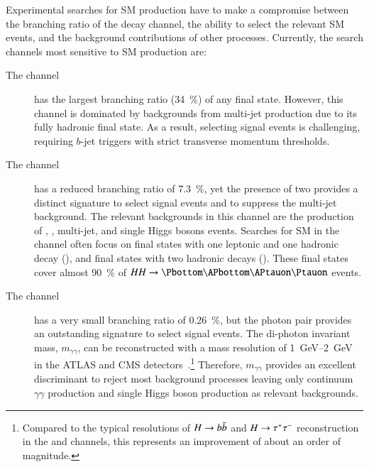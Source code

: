 Experimental searches for SM \HH production have to make a compromise between
the branching ratio of the decay channel, the ability to select the relevant SM
\HH events, and the background contributions of other processes. Currently, the
search channels most sensitive to SM \HH production are:
\begin{description}

\item[The \bbbb channel] has the largest branching ratio (\SI{34}{\percent}) of
  any final state. However, this channel is dominated by backgrounds from
  multi-jet production due to its fully hadronic final state. As a result,
  selecting signal events is challenging, requiring $b$-jet triggers with strict
  transverse momentum thresholds.

\item[The \bbtautau channel] has a reduced branching ratio of
  \SI{7.3}{\percent}, yet the presence of two \tauleptons provides a distinct
  signature to select signal events and to suppress the multi-jet
  background. The relevant backgrounds in this channel are the production of
  \ttbar, \Zjets, multi-jet, and single Higgs bosons events. Searches for SM \HH
  in the \bbtautau channel often focus on final states with one leptonic and one
  hadronic \taulepton decay (\lephad), and final states with two hadronic
  \taulepton decays (\hadhad). These final states cover almost \SI{90}{\percent}
  of $HH \to \bbtautau$ events.

\item[The \bbyy channel] has a very small branching ratio of
  \SI{0.26}{\percent}, but the photon pair provides an outstanding signature to
  select signal events. The di-photon invariant mass, $m_{\gamma\gamma}$, can be
  reconstructed with a mass resolution of \SIrange{1}{2}{\GeV} in the ATLAS and
  CMS detectors~\cite{PERF-2007-01,CMS-CMS-00-001}.\footnote{Compared to the
    typical resolutions of $H \to b\bar{b}$ and $H \to \tau^{+} \tau^{-}$ reconstruction in
    the \bbbb and \bbtautau channels, this represents an improvement of about an
    order of magnitude.} Therefore, $m_{\gamma\gamma}$ provides an excellent
  discriminant to reject most background processes leaving only continuum
  $\gamma\gamma$ production and single Higgs boson production as relevant
  backgrounds.

\end{description}

